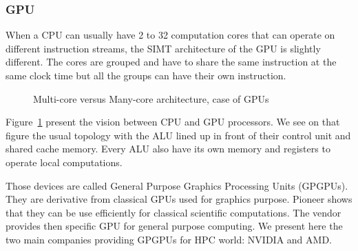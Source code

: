 \subsubsection{GPU}
When a CPU can usually have 2 to 32 computation cores that can operate on different instruction streams, the SIMT architecture of the GPU is slightly different. 
The cores are grouped and have to share the same instruction at the same clock time but all the groups can have their own instruction. 

\begin{figure}
\begin{center}
\hspace{1cm}
\end{center}
\caption{Multi-core versus Many-core architecture, case of GPUs}
\label{fig:2_HARD:gpu}
\end{figure}

Figure~\ref{fig:2_HARD:gpu} present the vision between CPU and GPU processors. 
We see on that figure the usual topology with the ALU lined up in front of their control unit and shared cache memory. 
Every ALU also have its own memory and registers to operate local computations. 

Those devices are called General Purpose Graphics Processing Units (GPGPUs). 
They are derivative from classical GPUs used for graphics purpose.
Pioneer shows that they can be use efficiently for classical scientific computations.
The vendor provides then specific GPU for general purpose computing.  
We present here the two main companies providing GPGPUs for HPC world: NVIDIA and AMD.

